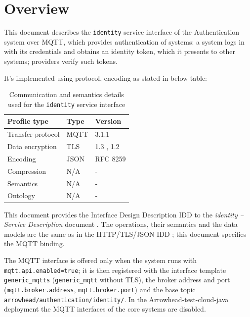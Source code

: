 \documentclass[a4paper]{arrowhead}
\begin{document}
\section{Overview}
\label{sec:overview}

This document describes the \texttt{identity} service interface of the Authentication system over MQTT, which provides authentication of systems: a system logs in with its credentials and obtains an identity token, which it presents to other systems; providers verify such tokens.

It's implemented using protocol, encoding as stated in below table:
\begin{table}[ht!]
  \centering
  \begin{tabular}{|l|l|l|}
    \hline
    \rowcolor{gray!33} Profile type & Type & Version \\ \hline
    Transfer protocol & MQTT & 3.1.1 \cite{mqtt311} \\ \hline
    Data encryption & TLS & 1.3 \cite{rfc8446}, 1.2 \cite{rfc5246} \\ \hline
    Encoding & JSON & RFC 8259 \cite{rfc8259} \\ \hline
    Compression & N/A & - \\ \hline
    Semantics & N/A & - \\ \hline
    Ontology & N/A & - \\ \hline
  \end{tabular}
  \caption{Communication and semantics details used for the \texttt{identity} service interface}
  \label{tab:comunication_semantics_profile}
\end{table}

This document provides the Interface Design Description IDD to the \textit{identity -- Service Description} document \cite{auth-identity-sd}.
The operations, their semantics and the data models are the same as in the HTTP/TLS/JSON IDD \cite{auth-identity-http-idd}; this document specifies the MQTT binding.

The MQTT interface is offered only when the system runs with \texttt{mqtt.api.enabled=true}; it is then registered with the interface template \texttt{generic\_\allowbreak{}mqtts} (\texttt{generic\_\allowbreak{}mqtt} without TLS), the broker address and port (\texttt{mqtt.\allowbreak{}broker.\allowbreak{}address}, \texttt{mqtt.\allowbreak{}broker.\allowbreak{}port}) and the base topic \texttt{arrowhead/\allowbreak{}authentication/\allowbreak{}identity/\allowbreak{}}. In the Arrowhead-test-cloud-java deployment the MQTT interfaces of the core systems are disabled.
\end{document}
